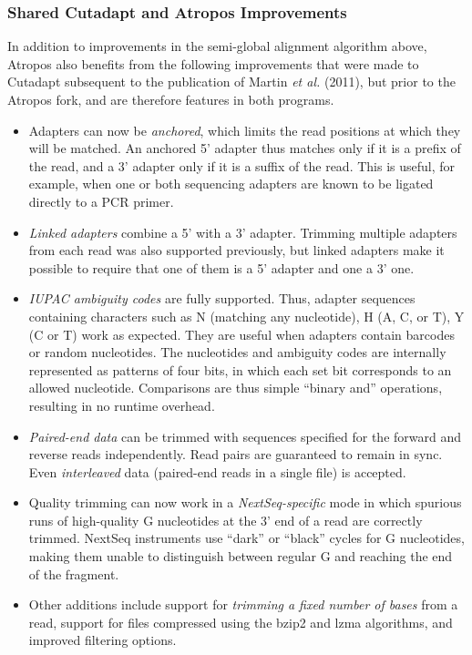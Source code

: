 \documentclass[fleqn,10pt,lineno]{wlpeerj} %
\begin{document}
\subsubsection{Shared Cutadapt and Atropos Improvements}

In addition to improvements in the semi-global alignment algorithm above, Atropos also benefits from the following improvements that were made to Cutadapt subsequent to the publication of Martin \textit{et al.} (2011), but prior to the Atropos fork, and are therefore features in both programs.

\begin{itemize}
\item Adapters can now be \emph{anchored}, which limits the read positions at which they will be matched. An anchored 5' adapter thus matches only if it is a prefix of the read, and a 3' adapter only if it is a suffix of the read. This is useful, for example, when one or both sequencing adapters are known to be ligated directly to a PCR primer.
\item \emph{Linked adapters} combine a 5' with a 3' adapter. Trimming multiple adapters from each read was also supported previously, but linked adapters make it possible to require that one of them is a 5' adapter and one a 3' one.
\item \emph{IUPAC ambiguity codes} are fully supported. Thus, adapter sequences containing characters such as N (matching any nucleotide), H (A, C, or T), Y (C or T) work as expected. They are useful when adapters contain barcodes or random nucleotides. The nucleotides and ambiguity codes are internally represented as patterns of four bits, in which each set bit corresponds to an allowed nucleotide. Comparisons are thus simple ``binary and'' operations, resulting in no runtime overhead.
\item \emph{Paired-end data} can be trimmed with sequences specified for the forward and reverse reads independently. Read pairs are guaranteed to remain in sync. Even \emph{interleaved} data (paired-end reads in a single file) is accepted.
\item Quality trimming can now work in a \emph{NextSeq-specific} mode in which spurious runs of high-quality G nucleotides at the 3' end of a read are correctly trimmed. NextSeq instruments use “dark” or “black” cycles for G nucleotides, making them unable to distinguish between regular G and reaching the end of the fragment.
\item Other additions include support for \emph{trimming a fixed number of bases} from a read, support for files compressed using the bzip2 and lzma algorithms, and improved filtering options.
\end{itemize}
\end{document}
